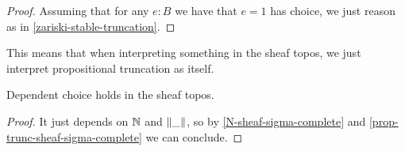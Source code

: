 \begin{proof}
Assuming that for any $e:B$ we have that $e=1$ has choice, we just reason as in \cref{zariski-stable-truncation}.
\end{proof}

This means that when interpreting something in the sheaf topos, we just interpret propositional truncation as itself.

\begin{theorem}
Dependent choice holds in the sheaf topos.
\end{theorem}

\begin{proof}
It just depends on $\mathbb{N}$ and $\lVert \_ \rVert$, so by \cref{N-sheaf-sigma-complete} and \cref{prop-trunc-sheaf-sigma-complete} we can conclude.
\end{proof}
